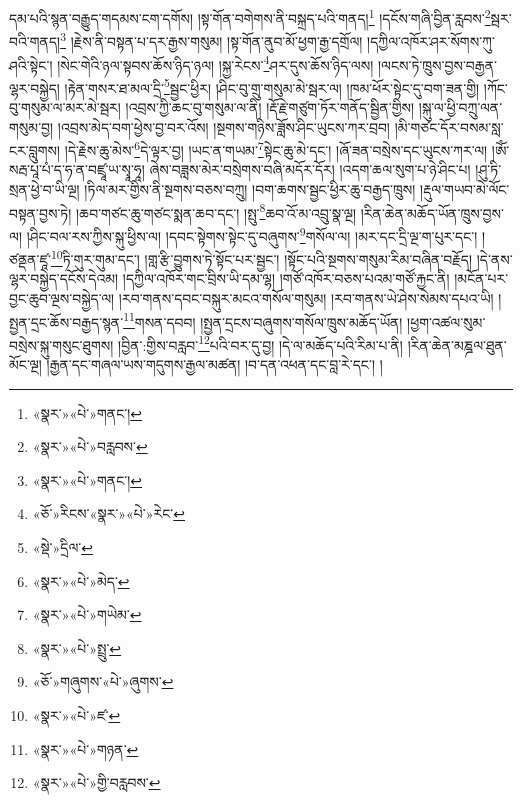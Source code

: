 དམ་པའི་སྙན་བརྒྱུད་གདམས་ངག་དགོས། །སྟ་གོན་བགེགས་ནི་བསྐྲད་པའི་གནད།\footnote{«སྣར་»«པེ་»གནང་།} །དངོས་གཞི་བྱིན་རླབས་\footnote{«སྣར་»«པེ་»བརླབས་}སྦར་བའི་གནད།\footnote{«སྣར་»«པེ་»གནང་།} །རྗེས་ནི་བསྟན་པ་དར་རྒྱས་གསུམ། །སྟ་གོན་ནུབ་མོ་ཕྱག་རྒྱ་དགྲོལ། །དཀྱིལ་འཁོར་ཤར་སོགས་ཀུ་ཤའི་སྟེང་། །སེང་གེའི་ཉལ་སྟབས་ཆོས་ཉིད་ཉལ། །སྐྱ་རེངས་\footnote{«ཅོ་»རིངས་«སྣར་»«པེ་»རེང་}ཤར་དུས་ཆོས་ཉིད་ལས། །ལངས་ཏེ་ཁྲུས་བྱས་བརྒྱན་ལྷར་བསྐྱེད། །རྟེན་གསར་ཐ་མལ་དྲི་\footnote{«སྡེ་»དྲིལ་}སྦྱང་ཕྱིར། །ཤིང་བུ་གྲུ་གསུམ་མེ་སྦར་ལ། །ཁམ་ཕོར་སྟེང་དུ་བག་ཟན་གྱི། །ཀོང་བུ་གསུམ་ལ་མར་མེ་སྦར། །འབྲས་ཀྱི་ཆང་བུ་གསུམ་ལ་ནི། །རྡོ་རྗེ་གཙུག་ཏོར་གནོད་སྦྱིན་གྱིས། །སྐུ་ལ་ཕྱི་བཀྲུ་ལན་གསུམ་བྱ། །འབྲས་མེད་བག་ཕྱེས་བྱ་བར་འོས། །སྔགས་གཉིས་ཟློས་ཤིང་ཡུངས་ཀར་བྲབ། །མི་གཙང་དོར་བསམ་སླ་ངར་བླུགས། །དེ་རྗེས་ཆུ་མེས་\footnote{«སྣར་»«པེ་»མེད་}དེ་ལྟར་བྱ། །ཡང་ན་གཡམ་\footnote{«སྣར་»«པེ་»གཡེམ་}སྟེང་ཆུ་མེ་དང་། །ཞོ་ཟན་བསྲེས་དང་ཡུངས་ཀར་ལ། །ཨོཾ་སརྦ་པཱ་པཾ་ད་ཧ་ན་བཛྲཱ་ཡ་སྭཱ་ཧཱ། ཞེས་བཟླས་མེར་བསྲེགས་བཞི་མདོར་དོར། །འདག་ཆལ་སུག་པ་ཉེ་ཤིང་པ། །ཤུ་ཏི་སྲན་ཕྱེ་བ་ཡི་ལྔ། །ཏིལ་མར་གྱིས་ནི་སྔགས་བཅས་བཀྲུ། །བག་ཆགས་སྦྱང་ཕྱིར་ཆུ་བརྒྱད་ཁྲུས། །རྡུལ་གཡབ་མེ་ལོང་བསྟན་བྱས་ཏེ། །ཆབ་གཙང་ཆུ་གཙང་སྨན་ཆབ་དང་། །སྤུ་\footnote{«སྣར་»«པེ་»སྤྲུ་}ཆབ་འོ་མ་འབྲུ་སྣ་ལྔ། །རིན་ཆེན་མཆོད་ཡོན་ཁྲུས་བྱས་ལ། །ཤིང་བལ་རས་ཀྱིས་སྐུ་ཕྱིས་ལ། །དབང་སྟེགས་སྟེང་དུ་བཞུགས་\footnote{«ཅོ་»གཞུགས་«པེ་»ཞུགས་}གསོལ་ལ། །མར་དང་དྲི་ལྔ་ག་པུར་དང་། །ཙནྡན་ཛཱ་\footnote{«སྣར་»«པེ་»ཛ་}ཏི་གུར་གུམ་དང་། །གླ་རྩི་བྱུགས་ཏེ་སྟོང་པར་སྦྱང་། །སྟོང་པའི་སྔགས་གསུམ་རིམ་བཞིན་བརྗོད། །དེ་ནས་ལྷར་བསྐྱེད་དངོས་དེའམ། །དཀྱིལ་འཁོར་གང་བྲིས་ཡི་དམ་ལྷ། །གཙོ་འཁོར་བཅས་པའམ་གཙོ་རྐྱང་ནི། །མངོན་པར་བྱང་ཆུབ་ལྔས་བསྐྱེད་ལ། །རབ་གནས་དབང་བསྐུར་མངའ་གསོལ་གསུམ། །རབ་གནས་ཡེ་ཤེས་སེམས་དཔའ་ཡི། །སྤྱན་དྲང་ཆོས་བརྒྱད་སྙན་\footnote{«སྣར་»«པེ་»གཉན་}གསན་དབབ། །སྤྱན་དྲངས་བཞུགས་གསོལ་ཁྲུས་མཆོད་ཡོན། །ཕྱག་འཚལ་སུམ་བསྲེས་སྐུ་གསུང་ཐུགས། །བྱིན་:གྱིས་བརླབ་\footnote{«སྣར་»«པེ་»གྱི་བརླབས་}པའི་བར་དུ་བྱ། །དེ་ལ་མཆོད་པའི་རིམ་པ་ནི། །རིན་ཆེན་མཎྜལ་ཐུན་མོང་ལྔ། །རྒྱན་དང་གཞལ་ཡས་གདུགས་རྒྱལ་མཚན། །བ་དན་འཕན་དང་བླ་རེ་དང་། །
